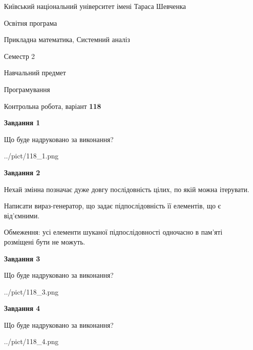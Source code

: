 \documentclass[12pt, ukrainian]{article}
\begin{document}
{{\begin {small}\par
{ \center  Київський національний університет імені Тараса Шевченка \par}
{\parbox {5 cm}{Освітня програма \hfill}{\parbox {8 cm}{Прикладна математика, Системний аналіз \hfill}}\parbox {5 cm}{\hfill Семестр 2}}\par
{\parbox {5 cm} {Навчальний предмет \hfill}\parbox {7 cm}{Програмування \hfill}\parbox {6cm}{\hfill}\par}\vspace{-7pt} \end{small}}{\center Контрольна робота, варіант  \No \textbf
{ 118 }\par}}
{
\begin {large}
{\begin {center}\textbf{Завдання 1}\end {center}}\par
Що буде надруковано за виконання?\par\par
\begin{center}
	{../pict/118_1.png}
\end{center}
\newpage

{\begin {center}\textbf{Завдання 2}\end {center}}\par
Нехай змінна  позначає дуже довгу послідовність цілих, по якій можна ітерувати.

Написати вираз-генератор, що задає підпослідовність її елементів, що є від'єм\-ни\-ми.

Обмеження: усі елементи шуканої підпослідовності одночасно в пам'яті розміщені бути не можуть.\par
\newpage

{\begin {center}\textbf{Завдання 3}\end {center}}\par
Що буде надруковано за виконання?\par
\begin{center}
	{../pict/118_3.png}
\end{center}
\newpage

{\begin {center}\textbf{Завдання 4}\end {center}}\par
Що буде надруковано за виконання?\par
\begin{center}
	{../pict/118_4.png}
\end{center}
\newpage


\end{large}}
\end{document}
